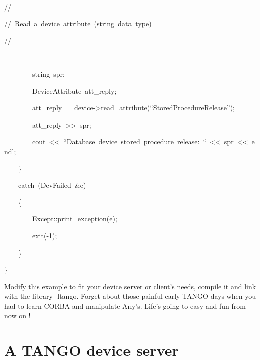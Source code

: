 \begin{lyxcode}
~

//

//~Read~a~device~attribute~(string~data~type)

//

~

~~~~~~~~string~spr;

~~~~~~~~DeviceAttribute~att\_reply;

~~~~~~~~att\_reply~=~device->read\_attribute(``StoredProcedureRelease'');

~~~~~~~~att\_reply~>\textcompwordmark{}>~spr;

~~~~~~~~cout~<\textcompwordmark{}<~``Database~device~stored~procedure~release:~``~<\textcompwordmark{}<~spr~<\textcompwordmark{}<~endl;

~~~~\}

\noindent ~~~~catch~(DevFailed~\&e)

\noindent ~~~~\{

\noindent ~~~~~~~~Except::print\_exception(e);

\noindent ~~~~~~~~exit(-1);

\noindent ~~~~\}~

\noindent \}
\end{lyxcode}


\noindent Modify this example to fit your device server or client's
needs, compile it and link with the library -ltango. Forget about
those painful early TANGO days when you had to learn CORBA and manipulate
Any's. Life's going to easy and fun from now on !

\section{A TANGO device server}

